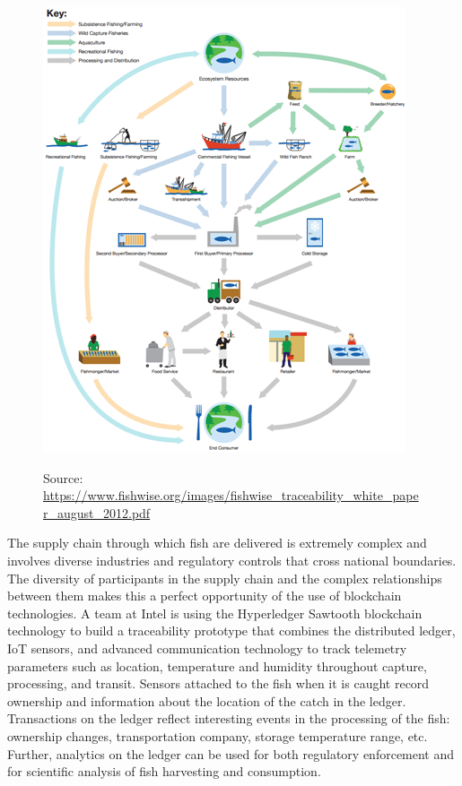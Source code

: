 \begin{figure}
   \includegraphics[scale=1.0]{figures/FishSupplyChain.png} \
   \caption{Source: \url{https://www.fishwise.org/images/fishwise_traceability_white_paper_august_2012.pdf}}
  \label{fig:supplychain}
\end{figure}

The supply chain through which fish are delivered is extremely complex
and involves diverse industries and regulatory controls that cross national boundaries. The
diversity of participants in the supply chain and the complex relationships between them makes this
a perfect opportunity of the use of blockchain technologies. A team at Intel is using the
Hyperledger Sawtooth blockchain technology to build a traceability prototype that combines the
distributed ledger, IoT sensors, and advanced communication technology to track telemetry parameters
such as location, temperature and humidity throughout capture, processing, and transit. Sensors
attached to the fish when it is caught record ownership and information about the location of the
catch in the ledger. Transactions on the ledger reflect interesting events in the processing of the
fish: ownership changes, transportation company, storage temperature range, etc. Further, analytics
on the ledger can be used for both regulatory enforcement and for scientific analysis of fish
harvesting and consumption.

